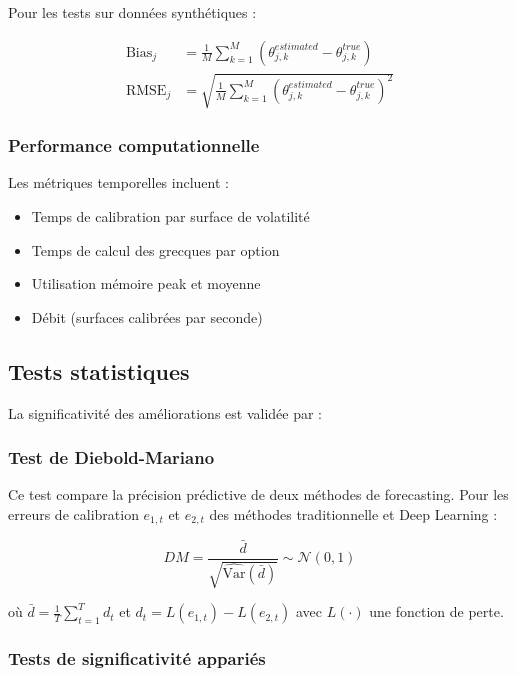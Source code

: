 Pour les tests sur données synthétiques :

\begin{align}
\text{Bias}_j &= \frac{1}{M} \sum_{k=1}^{M} \left(\theta_{j,k}^{estimated} - \theta_{j,k}^{true}\right) \\
\text{RMSE}_j &= \sqrt{\frac{1}{M} \sum_{k=1}^{M} \left(\theta_{j,k}^{estimated} - \theta_{j,k}^{true}\right)^2}
\end{align}

\subsubsection{Performance computationnelle}

Les métriques temporelles incluent :
\begin{itemize}
\item Temps de calibration par surface de volatilité
\item Temps de calcul des grecques par option
\item Utilisation mémoire peak et moyenne
\item Débit (surfaces calibrées par seconde)
\end{itemize}

\subsection{Tests statistiques}

La significativité des améliorations est validée par :

\subsubsection{Test de Diebold-Mariano}

Ce test compare la précision prédictive de deux méthodes de forecasting. Pour les erreurs de calibration $e_{1,t}$ et $e_{2,t}$ des méthodes traditionnelle et Deep Learning :

\begin{equation}
DM = \frac{\bar{d}}{\sqrt{\widehat{\text{Var}}(\bar{d})}} \sim \mathcal{N}(0,1)
\end{equation}

où $\bar{d} = \frac{1}{T}\sum_{t=1}^{T} d_t$ et $d_t = L(e_{1,t}) - L(e_{2,t})$ avec $L(\cdot)$ une fonction de perte.

\subsubsection{Tests de significativité appariés}

